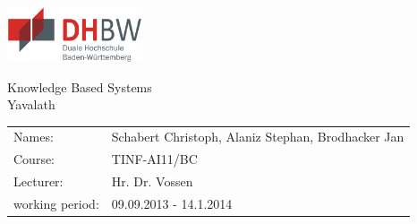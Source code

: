 \documentclass[english]{report}
\begin{document}
\pagestyle{fancy}
\lhead{}%

\lfoot{}%
\rfoot{\thepage}
\fancyhfoffset{\marginparsep}
\renewcommand{\footrulewidth}{1.0pt}
\renewcommand{\headrulewidth}{1.0pt}
\renewcommand{\headheight}{30pt}





\begin{titlepage}

\begin{flushright}
    \includegraphics*[width=4.0cm]{abbildungen/dhbwlogo} \\ 
\end{flushright}
\begin{center}
\vspace{1.5cm}
\Huge{ \textsf{Knowledge Based Systems}} \\
	Yavalath\\
    \vspace{4cm}
 \normalsize{
    \begin{tabular}{ll}
    	Names: & {Schabert Christoph,  Alaniz Stephan,  Brodhacker Jan} \\
    	Course: & {TINF-AI11/BC}	\\
    	Lecturer: &  {Hr. Dr. Vossen}\\
    	working period: & {09.09.2013 - 14.1.2014}
    \end{tabular}\\
    }
\end{center}

\end{titlepage}

\newpage
\end{document}
